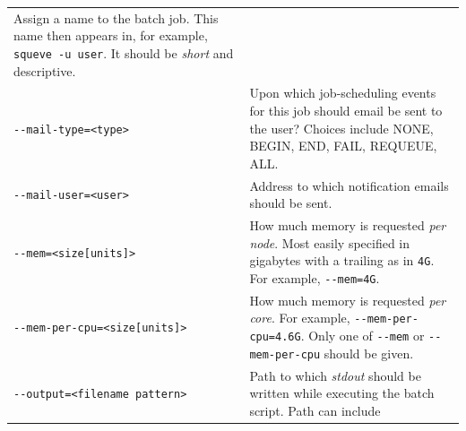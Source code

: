 \documentclass[]{krantz}
\begin{document}
\begin{longtable}[]{@{}ll@{}}
\begin{minipage}[t]{0.46\columnwidth}
Assign a name to the batch
job. This name then appears
in, for example, \texttt{squeve\ -u\ user}. It should be \emph{short}
and descriptive.\strut
\end{minipage}\tabularnewline
\begin{minipage}[t]{0.44\columnwidth}\raggedright
\texttt{-\/-mail-type=\textless{}type\textgreater{}}\strut
\end{minipage} & \begin{minipage}[t]{0.46\columnwidth}\raggedright
Upon which job-scheduling
events for this job should
email be sent to the user?
Choices include NONE, BEGIN,
END, FAIL, REQUEUE, ALL.\strut
\end{minipage}\tabularnewline
\begin{minipage}[t]{0.44\columnwidth}\raggedright
\texttt{-\/-mail-user=\textless{}user\textgreater{}}\strut
\end{minipage} & \begin{minipage}[t]{0.46\columnwidth}\raggedright
Address to which notification
emails should be sent.\strut
\end{minipage}\tabularnewline
\begin{minipage}[t]{0.44\columnwidth}\raggedright
\texttt{-\/-mem=\textless{}size{[}units{]}\textgreater{}}\strut
\end{minipage} & \begin{minipage}[t]{0.46\columnwidth}\raggedright
How much memory is requested
\emph{per node}. Most easily
specified in gigabytes with a
trailing as in \texttt{4G}. For
example, \texttt{-\/-mem=4G}.\strut
\end{minipage}\tabularnewline
\begin{minipage}[t]{0.44\columnwidth}\raggedright
\texttt{-\/-mem-per-cpu=\textless{}size{[}units{]}\textgreater{}}\strut
\end{minipage} & \begin{minipage}[t]{0.46\columnwidth}\raggedright
How much memory is requested
\emph{per core}. For example,
\texttt{-\/-mem-per-cpu=4.6G}. Only
one of \texttt{-\/-mem} or
\texttt{-\/-mem-per-cpu} should be
given.\strut
\end{minipage}\tabularnewline
\begin{minipage}[t]{0.44\columnwidth}\raggedright
\texttt{-\/-output=\textless{}filename\ pattern\textgreater{}}\strut
\end{minipage} & \begin{minipage}[t]{0.46\columnwidth}\raggedright
Path to which \emph{stdout} should
be written while executing the
batch script. Path can include

\end{minipage}
\end{longtable}
\end{document}

